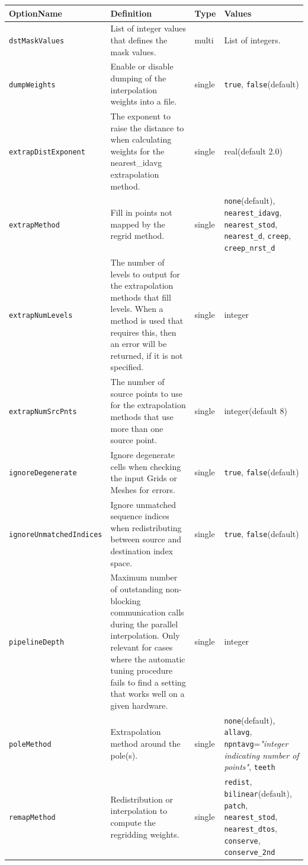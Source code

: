 \begin{longtable}{|p{5cm}|p{5cm}|p{1cm}|p{35mm}|}
     \hline\hline
     {\bf OptionName} & {\bf Definition} & {\bf Type} & {\bf Values}\\
     \hline\hline
     {\tt dstMaskValues} & List of integer values that defines the mask values. & multi & List of integers.\\ \hline
     {\tt dumpWeights} & Enable or disable dumping of the interpolation weights into a file. & single & {\tt true}, {\tt false}(default)\\ \hline
     {\tt extrapDistExponent} & The exponent to raise the distance to when calculating weights for the nearest\_idavg extrapolation method. & single & real(default 2.0)\\ \hline
     {\tt extrapMethod} & Fill in points not mapped by the regrid method. & single & {\tt none}(default), {\tt nearest\_idavg}, {\tt nearest\_stod}, {\tt nearest\_d}, {\tt creep}, {\tt creep\_nrst\_d} \\ \hline
     {\tt extrapNumLevels} & The number of levels to output for the extrapolation methods that fill levels. When a method is used that requires this, then an error will be returned, if it is not specified. & single & integer\\ \hline
     {\tt extrapNumSrcPnts} & The number of source points to use for the extrapolation methods that use more than one source point. & single & integer(default 8)\\ \hline
     {\tt ignoreDegenerate} & Ignore degenerate cells when checking the input Grids or Meshes for errors. & single & {\tt true}, {\tt false}(default)\\ \hline
     {\tt ignoreUnmatchedIndices} & Ignore unmatched sequence indices when redistributing between source and destination index space. & single & {\tt true}, {\tt false}(default)\\ \hline
     {\tt pipelineDepth} & Maximum number of outstanding non-blocking communication calls during the parallel interpolation. Only relevant for cases where the automatic tuning procedure fails to find a setting that works well on a given hardware. & single & integer\\ \hline
     {\tt poleMethod} & Extrapolation method around the pole(s). & single & {\tt none}(default), {\tt allavg}, {\tt npntavg}={\em "integer indicating number of points"}, {\tt teeth}\\ \hline
     {\tt remapMethod} & Redistribution or interpolation to compute the regridding weights. & single & {\tt redist}, {\tt bilinear}(default), {\tt patch}, {\tt nearest\_stod}, {\tt nearest\_dtos}, {\tt conserve}, {\tt conserve\_2nd}\\ \hline

\end{longtable}
